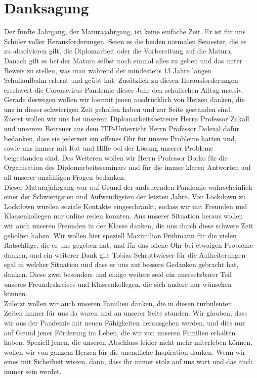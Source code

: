 \chapter{Danksagung} 
Der fünfte Jahrgang, der Maturajahrgang, ist keine einfache Zeit. Er ist für uns Schüler voller Herausforderungen. Seien es die beiden normalen Semester, die es zu absolvieren gilt, die Diplomarbeit oder die Vorbereitung auf die Matura. Danach gilt es bei der Matura selbst noch einmal alles zu geben und das unter Beweis zu stellen, was man während der mindestens 13 Jahre langen Schullaufbahn erlernt und geübt hat. Zusätzlich zu diesen Herausforderungen erschwert die Coronavirus-Pandemie dieses Jahr den schulischen Alltag massiv. Gerade deswegen wollen wir hiermit jenen ausdrücklich von Herzen danken, die uns in dieser schwierigen Zeit geholfen haben und zur Seite gestanden sind.\\

Zuerst wollen wir uns bei unserem Diplomarbeitsbetreuer Herrn Professor Zakall und unserem Betreuer aus dem ITP-Unterricht Herrn Professor Dolezal dafür bedanken, dass sie jederzeit ein offenes Ohr für unsere Probleme hatten und, sowie uns immer mit Rat und Hilfe bei der Lösung unserer Probleme beigestanden sind. Des Weiteren wollen wir Herrn Professor Borko für die Organisation des Diplomarbeitsseminars und für die immer klaren Antworten auf all unserer unzähligen Fragen bedanken.\\

Dieser Maturajahrgang war auf Grund der andauernden Pandemie wahrscheinlich einer der Schwierigsten und Aufwendigsten der letzten Jahre. Von Lockdown zu Lockdown wurden soziale Kontakte eingeschränkt, sodass wir mit Freunden und Klassenkollegen nur online reden konnten. Aus unserer Situation heraus wollen wir auch unseren Freunden in der Klasse danken, die uns durch diese schwere Zeit geholfen haben. Wir wollen hier speziell Maximilian Frühmann für die vielen Ratschläge, die er uns gegeben hat, und für das offene Ohr bei etwaigen Probleme danken, und ein weiterer Dank gilt Tobias Schrottwieser für die Aufheiterungen egal in welcher Situation und dass er uns auf bessere Gedanken gebracht hat, danken. Diese zwei besonders und einige weitere seid ein unersetzbarer Teil unseres Freundeskreises und Klassenkollegen, die sich andere nur wünschen können.\\

Zuletzt wollen wir auch unseren Familien danken, die in diesen turbulenten Zeiten immer für uns da waren und an unserer Seite standen. Wir glauben, dass wir aus der Pandemie mit neuen Fähigkeiten herausgehen werden, und dies nur auf Grund jener Förderung im Leben, die wir von unseren Familien erhalten haben. 
Speziell jenen, die unseren Abschluss leider nicht mehr miterleben können, wollen wir von ganzem Herzen für die unendliche Inspiration danken. Wenn wir eines mit Sicherheit wissen, dann, dass ihr immer stolz auf uns wart und das auch immer sein werdet.